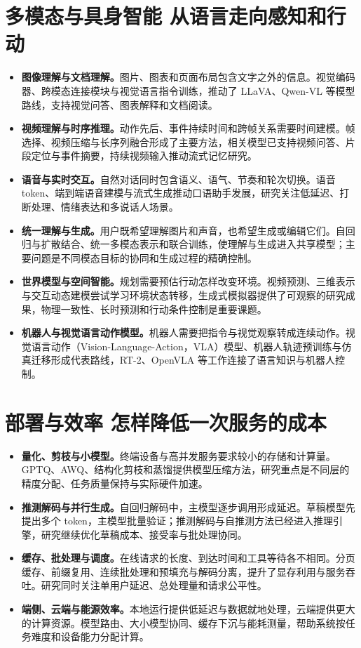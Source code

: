 \section{多模态与具身智能 从语言走向感知和行动}

\begin{itemize}
    \item \textbf{图像理解与文档理解。}图片、图表和页面布局包含文字之外的信息。视觉编码器、跨模态连接模块与视觉语言指令训练，推动了 LLaVA、Qwen-VL 等模型路线，支持视觉问答、图表解释和文档阅读。
    \item \textbf{视频理解与时序推理。}动作先后、事件持续时间和跨帧关系需要时间建模。帧选择、视频压缩与长序列融合形成了主要方法，相关模型已支持视频问答、片段定位与事件摘要，持续视频输入推动流式记忆研究。
    \item \textbf{语音与实时交互。}自然对话同时包含语义、语气、节奏和轮次切换。语音 token、端到端语音建模与流式生成推动口语助手发展，研究关注低延迟、打断处理、情绪表达和多说话人场景。
    \item \textbf{统一理解与生成。}用户既希望理解图片和声音，也希望生成或编辑它们。自回归与扩散结合、统一多模态表示和联合训练，使理解与生成进入共享模型；主要问题是不同模态目标的协同和生成过程的精确控制。
    \item \textbf{世界模型与空间智能。}规划需要预估行动怎样改变环境。视频预测、三维表示与交互动态建模尝试学习环境状态转移，生成式模拟器提供了可观察的研究成果，物理一致性、长时预测和行动条件控制是重要课题。
    \item \textbf{机器人与视觉语言动作模型。}机器人需要把指令与视觉观察转成连续动作。视觉语言动作（Vision-Language-Action，VLA）模型、机器人轨迹预训练与仿真迁移形成代表路线，RT-2、OpenVLA 等工作连接了语言知识与机器人控制。
\end{itemize}

\section{部署与效率 怎样降低一次服务的成本}

\begin{itemize}
    \item \textbf{量化、剪枝与小模型。}终端设备与高并发服务要求较小的存储和计算量。GPTQ、AWQ、结构化剪枝和蒸馏提供模型压缩方法，研究重点是不同层的精度分配、任务质量保持与实际硬件加速。
    \item \textbf{推测解码与并行生成。}自回归解码中，主模型逐步调用形成延迟。草稿模型先提出多个 token，主模型批量验证；推测解码与自推测方法已经进入推理引擎，研究继续优化草稿成本、接受率与批处理协同。
    \item \textbf{缓存、批处理与调度。}在线请求的长度、到达时间和工具等待各不相同。分页缓存、前缀复用、连续批处理和预填充与解码分离，提升了显存利用与服务吞吐。研究同时关注单用户延迟、总处理量和请求公平性。
    \item \textbf{端侧、云端与能源效率。}本地运行提供低延迟与数据就地处理，云端提供更大的计算资源。模型路由、大小模型协同、缓存下沉与能耗测量，帮助系统按任务难度和设备能力分配计算。
\end{itemize}

